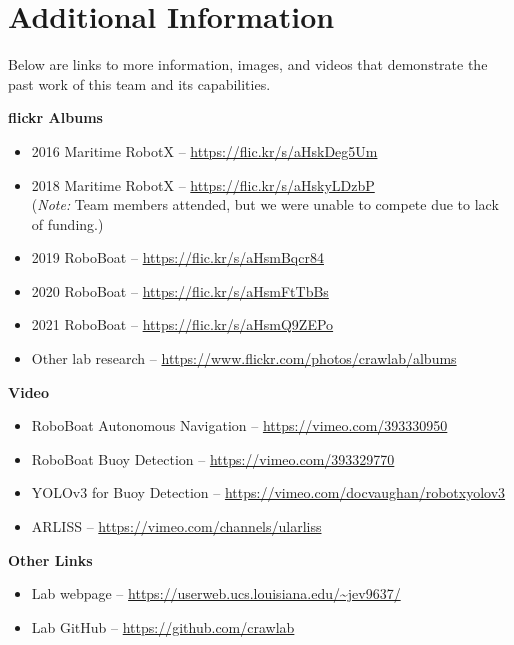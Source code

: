 \documentclass[12 pt]{article}
\begin{document}
\section{Additional Information}
\label{sec:additional}
\vspace{-0.2in}
%
Below are links to more information, images, and videos that demonstrate the past work of this team and its capabilities. 

\textbf{flickr Albums}
\vspace{-0.2in}
\begin{itemize}[noitemsep,nolistsep]
	\item 2016 Maritime RobotX -- \url{https://flic.kr/s/aHskDeg5Um}
	\item 2018 Maritime RobotX -- \url{https://flic.kr/s/aHskyLDzbP} \\(\textit{Note:} Team members attended, but we were unable to compete due to lack of funding.)
	\item 2019 RoboBoat -- \url{https://flic.kr/s/aHsmBqcr84}
	\item 2020 RoboBoat -- \url{https://flic.kr/s/aHsmFtTbBs}
	\item 2021 RoboBoat -- \url{https://flic.kr/s/aHsmQ9ZEPo}
	\item Other lab research -- \url{https://www.flickr.com/photos/crawlab/albums}
\end{itemize}

\textbf{Video}
\vspace{-0.2in}
\begin{itemize}[noitemsep,nolistsep]
	\item RoboBoat Autonomous Navigation -- \url{https://vimeo.com/393330950}
	\item RoboBoat Buoy Detection -- \url{https://vimeo.com/393329770}
	\item YOLOv3 for Buoy Detection -- \url{https://vimeo.com/docvaughan/robotxyolov3}
	\item ARLISS -- \url{https://vimeo.com/channels/ularliss}
\end{itemize}
	
\textbf{Other Links}
\vspace{-0.2in}
\begin{itemize}[noitemsep,nolistsep]
	\item Lab webpage -- \url{https://userweb.ucs.louisiana.edu/~jev9637/}
	\item Lab GitHub -- \url{https://github.com/crawlab}
\end{itemize}
\end{document}
